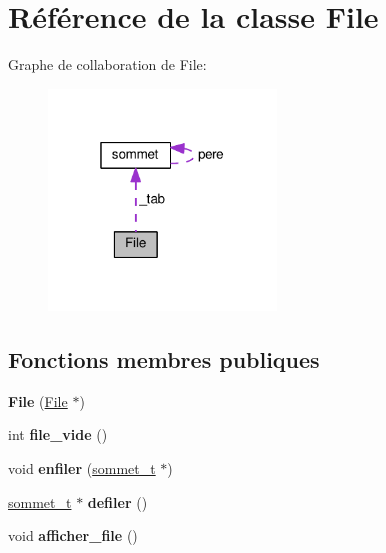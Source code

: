 \hypertarget{classFile}{\section{Référence de la classe File}
\label{classFile}
}


Graphe de collaboration de File\+:\nopagebreak
\begin{figure}[H]
\begin{center}
\leavevmode
\includegraphics[width=172pt]{classFile__coll__graph}
\end{center}
\end{figure}
\subsection*{Fonctions membres publiques}
\begin{DoxyCompactItemize}
\item 
\hypertarget{classFile_a16cac2bfb7ce2d6d6fc85c8c6c1afb51}{{\bfseries File} (\hyperlink{classFile}{File} $\ast$)}\label{classFile_a16cac2bfb7ce2d6d6fc85c8c6c1afb51}

\item 
\hypertarget{classFile_a836c721d825c6d5593101fd3c2ef20fe}{int {\bfseries file\+\_\+vide} ()}\label{classFile_a836c721d825c6d5593101fd3c2ef20fe}

\item 
\hypertarget{classFile_a23378a28204e6df4fadf73cb91e99340}{void {\bfseries enfiler} (\hyperlink{structsommet}{sommet\+\_\+t} $\ast$)}\label{classFile_a23378a28204e6df4fadf73cb91e99340}

\item 
\hypertarget{classFile_a8c89b0bdf8a47894e784313eb15e5a46}{\hyperlink{structsommet}{sommet\+\_\+t} $\ast$ {\bfseries defiler} ()}\label{classFile_a8c89b0bdf8a47894e784313eb15e5a46}

\item 
\hypertarget{classFile_a1736d1e403772c3df0faabab421097c0}{void {\bfseries afficher\+\_\+file} ()}\label{classFile_a1736d1e403772c3df0faabab421097c0}

\end{DoxyCompactItemize}
